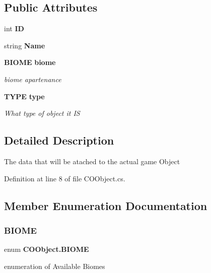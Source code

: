 \subsection*{Public Attributes}
\begin{DoxyCompactItemize}
\item 
int \textbf{ ID}
\item 
string \textbf{ Name}
\item 
\textbf{ B\+I\+O\+ME} \textbf{ biome}
\begin{DoxyCompactList}\small\item\em biome apartenance \end{DoxyCompactList}\item 
\textbf{ T\+Y\+PE} \textbf{ type}
\begin{DoxyCompactList}\small\item\em What type of object it IS \end{DoxyCompactList}\end{DoxyCompactItemize}


\subsection{Detailed Description}
The data that will be atached to the actual game Object 



Definition at line 8 of file C\+O\+Object.\+cs.



\subsection{Member Enumeration Documentation}
\mbox{\label{class_c_o_object_a723c86f12371846ea19c3cc3337a247e}} 
\subsubsection{B\+I\+O\+ME}
{\footnotesize\ttfamily enum \textbf{ C\+O\+Object.\+B\+I\+O\+ME}\hspace{0.3cm}{\ttfamily [strong]}}



enumeration of Available Biomes 


